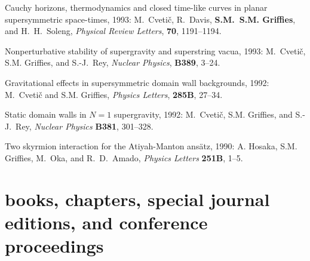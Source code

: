 \begin{etaremune}
\item Cauchy horizons, thermodynamics and closed time-like curves in
planar supersymmetric space-times, 1993: M.\ Cveti\v c, R.\ Davis, {\bf
S.M.\ S.M. Grif\/f\/ies}, and H.\ H.\ Soleng, {\em Physical Review
Letters}, {\bf 70}, 1191--1194.
                                                                 
\item Nonperturbative stability of supergravity and superstring vacua, 1993:
M.\ Cveti\v c, S.M. Grif\/f\/ies, and S.-J.\ Rey, {\em Nuclear
Physics}, {\bf B389}, 3--24.
 
\item Gravitational effects in supersymmetric domain wall
backgrounds, 1992: M.\ Cveti\v c and S.M. Grif\/f\/ies, {\em
Physics Letters}, {\bf 285B}, 27--34.

\item Static domain walls in $N=1$ supergravity, 1992: M.\ Cveti\v
c, S.M. Grif\/f\/ies, and S.-J.\ Rey, {\em Nuclear Physics}
{\bf B381}, 301--328.

\item Two skyrmion interaction for the Atiyah-Manton ans\"atz, 1990: 
A. Hosaka, S.M. Grif\/f\/ies, M.\ Oka, and R.\ D.\ Amado, {\em
Physics Letters} {\bf 251B}, 1--5.


\end{etaremune}

\section*{\sc \color{Maroon} books, chapters, special journal editions, and
  conference proceedings}


